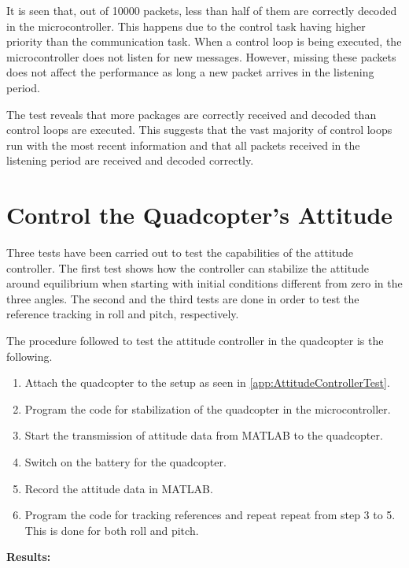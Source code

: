 It is seen that, out of 10000 packets, less than half of them are correctly decoded in the microcontroller. This happens due to the control task having higher priority than the communication task. When a control loop is being executed, the microcontroller does not listen for new messages. However, missing these packets does not affect the performance as long a new packet arrives in the listening period.

The test reveals that more packages are correctly received and decoded than control loops are executed. This suggests that the vast majority of control loops run with the most recent information and that all packets received in the listening period are received and decoded correctly. 

\section{Control the Quadcopter's Attitude} \label{sec:accepttestAttitude}
Three tests have been carried out to test the capabilities of the attitude controller. The first test shows how the controller can stabilize the attitude around equilibrium when starting with initial conditions different from zero in the three angles. The second and the third tests are done in order to test the reference tracking in roll and pitch, respectively.

The procedure followed to test the attitude controller in the quadcopter is the following.
\begin{enumerate}
	\item Attach the quadcopter to the setup as seen in \autoref{app:AttitudeControllerTest}.
    \item Program the code for stabilization of the quadcopter in the microcontroller.
	\item Start the transmission of attitude data from MATLAB to the quadcopter.
	\item Switch on the battery for the quadcopter.
	\item Record the attitude data in MATLAB.
    \item Program the code for tracking references and repeat repeat from step 3 to 5. This is done for both roll and pitch.
\end{enumerate}
 
\textbf{Results:}

